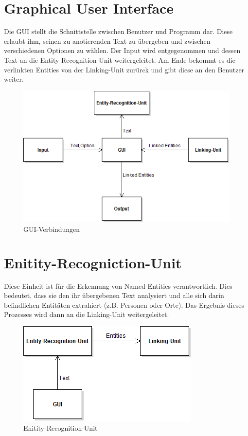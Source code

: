 \documentclass[11pt, a4paper, oneside]{Thesis} %
\begin{document}
\section{Graphical User Interface}
Die GUI stellt die Schnittstelle zwischen Benutzer und Programm dar. Diese erlaubt ihm, seinen zu anotierenden Text zu \"ubergeben und zwischen verschiedenen Optionen zu w\"ahlen. Der Input wird entgegenommen und dessen Text an die Entity-Recognition-Unit weitergeleitet. Am Ende bekommt es die verlinkten Entities von der Linking-Unit zur\"urck und gibt diese an den Benutzer weiter.
\begin{figure}[!ht]
\centering
\includegraphics[scale=0.55]{./GUI.png}
\caption[GUI]{GUI-Verbindungen}
\end{figure}


\section{Enitity-Recogniction-Unit}
Diese Einheit ist f\"ur die Erkennung von Named Entities verantwortlich. Dies bedeutet, dass sie den ihr \"ubergebenen Text analysiert und alle sich darin befindlichen Entit\"aten extrahiert (z.B. Personen oder Orte). Das Ergebnis dieses Prozesses wird dann an die Linking-Unit weitergeleitet.
\begin{figure}[ht!]
\centering
\includegraphics[scale=0.55]{./eeu.png}
\caption[EEnitity-Recognition-Unit]{Enitity-Recognition-Unit}
\end{figure}
\end{document}
